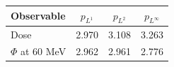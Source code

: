 \begin{tabular}{lccc}
\toprule
Observable & $p_{L^1}$ & $p_{L^2}$ & $p_{L^\infty}$ \\
\midrule
Dose & 2.970 & 3.108 & 3.263 \\
$\Phi$ at 60 MeV & 2.962 & 2.961 & 2.776 \\
\bottomrule
\end{tabular}
